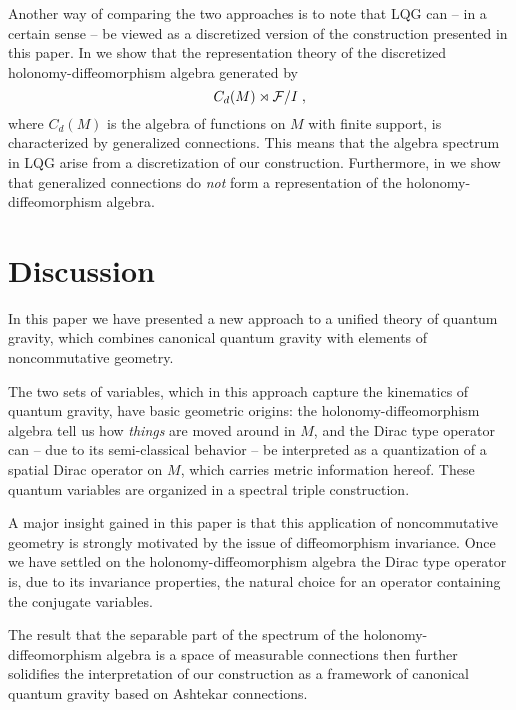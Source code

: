 \documentclass[12pt]{article}
\newcommand{\cF}{{\cal F}}
\begin{document}
Another way of comparing the two approaches is to note that LQG can -- in a certain sense -- be viewed as a discretized version of the construction presented in this paper. In \cite{AGnew} we show that the representation theory of the discretized holonomy-diffeomorphism algebra generated by %
$$
 C_d(M)  \rtimes  \cF  / I\;,
$$
where $ C_d(M)$ is the algebra of functions on $M$ with finite support, is characterized by generalized connections.
This means that the algebra spectrum in LQG arise from a discretization of our construction. Furthermore, in \cite{AGnew} we show that generalized connections do {\it not} form a representation of the holonomy-diffeomorphism algebra.










\section{Discussion}
\label{Discussion}


In this paper we have presented a new approach to a unified theory of quantum gravity, which combines canonical quantum gravity with elements of noncommutative geometry. 



The two sets of variables, which in this approach capture the kinematics of quantum gravity, have basic geometric origins: the holonomy-diffeomorphism algebra tell us how {\it things} are moved around in $M$, and the Dirac type operator can -- due to its semi-classical behavior -- be interpreted as a quantization of a spatial Dirac operator on $M$, which carries metric information hereof. These quantum variables are organized in a spectral triple construction.



A major insight gained in this paper is that this application of noncommutative geometry is strongly motivated by the issue of diffeomorphism invariance. Once we have settled on the holonomy-diffeomorphism algebra the Dirac type operator is, due to its invariance properties, the natural choice for an operator containing the conjugate variables.

The result that the separable part of the spectrum of the holonomy-diffeomorphism algebra is a space of measurable connections then further solidifies the interpretation of our construction as a framework of canonical quantum gravity based on Ashtekar connections.
\end{document}
